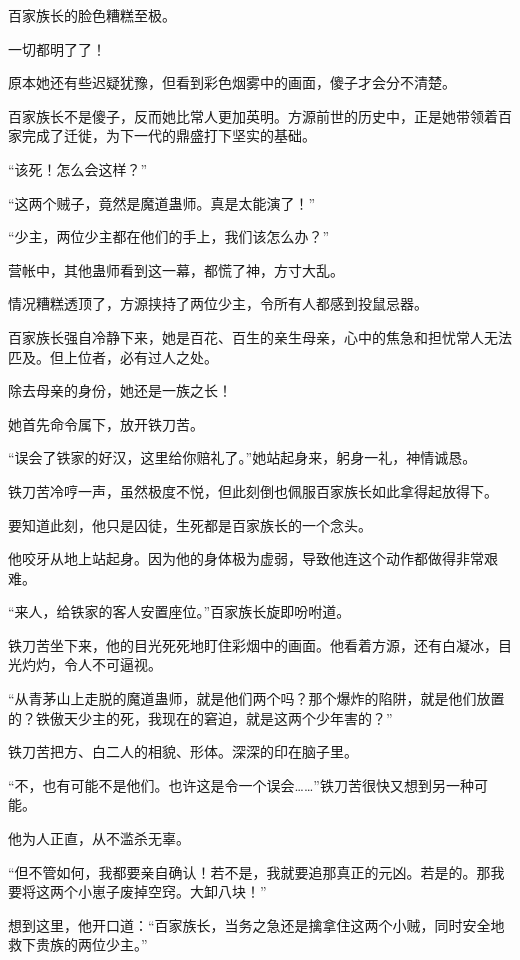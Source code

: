 
\begin{this_body}

百家族长的脸色糟糕至极。

一切都明了了！

原本她还有些迟疑犹豫，但看到彩色烟雾中的画面，傻子才会分不清楚。

百家族长不是傻子，反而她比常人更加英明。方源前世的历史中，正是她带领着百家完成了迁徙，为下一代的鼎盛打下坚实的基础。

“该死！怎么会这样？”

“这两个贼子，竟然是魔道蛊师。真是太能演了！”

“少主，两位少主都在他们的手上，我们该怎么办？”

营帐中，其他蛊师看到这一幕，都慌了神，方寸大乱。

情况糟糕透顶了，方源挟持了两位少主，令所有人都感到投鼠忌器。

百家族长强自冷静下来，她是百花、百生的亲生母亲，心中的焦急和担忧常人无法匹及。但上位者，必有过人之处。

除去母亲的身份，她还是一族之长！

她首先命令属下，放开铁刀苦。

“误会了铁家的好汉，这里给你赔礼了。”她站起身来，躬身一礼，神情诚恳。

铁刀苦冷哼一声，虽然极度不悦，但此刻倒也佩服百家族长如此拿得起放得下。

要知道此刻，他只是囚徒，生死都是百家族长的一个念头。

他咬牙从地上站起身。因为他的身体极为虚弱，导致他连这个动作都做得非常艰难。

“来人，给铁家的客人安置座位。”百家族长旋即吩咐道。

铁刀苦坐下来，他的目光死死地盯住彩烟中的画面。他看着方源，还有白凝冰，目光灼灼，令人不可逼视。

“从青茅山上走脱的魔道蛊师，就是他们两个吗？那个爆炸的陷阱，就是他们放置的？铁傲天少主的死，我现在的窘迫，就是这两个少年害的？”

铁刀苦把方、白二人的相貌、形体。深深的印在脑子里。

“不，也有可能不是他们。也许这是令一个误会……”铁刀苦很快又想到另一种可能。

他为人正直，从不滥杀无辜。

“但不管如何，我都要亲自确认！若不是，我就要追那真正的元凶。若是的。那我要将这两个小崽子废掉空窍。大卸八块！”

想到这里，他开口道：“百家族长，当务之急还是擒拿住这两个小贼，同时安全地救下贵族的两位少主。”


\end{this_body}
